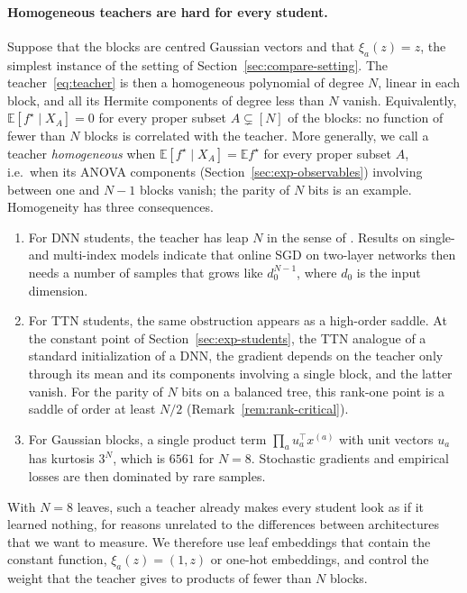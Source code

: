 \documentclass[11pt]{article}
\newcommand{\E}{\mathbb{E}}
\theoremstyle{definition}
\numberwithin{equation}{section}
\begin{document}
\paragraph{Homogeneous teachers are hard for every student.}
Suppose that the blocks are centred Gaussian vectors and that $\xi_a(z)=z$, the simplest instance of the setting of Section~\ref{sec:compare-setting}. The teacher~\eqref{eq:teacher} is then a homogeneous polynomial of degree $N$, linear in each block, and all its Hermite components of degree less than $N$ vanish. Equivalently, $\E[f^\star\mid X_A]=0$ for every proper subset $A\subsetneq[N]$ of the blocks: no function of fewer than $N$ blocks is correlated with the teacher. More generally, we call a teacher \emph{homogeneous} when $\E[f^\star\mid X_A]=\E f^\star$ for every proper subset $A$, i.e.\ when its ANOVA components (Section~\ref{sec:exp-observables}) involving between one and $N-1$ blocks vanish; the parity of $N$ bits is an example. Homogeneity has three consequences.
\begin{enumerate}[label=(\roman*),nosep]
\item For DNN students, the teacher has leap $N$ in the sense of \citet{abbe2023sgd}. Results on single- and multi-index models \citep{benarous2021online,abbe2023sgd} indicate that online SGD on two-layer networks then needs a number of samples that grows like $d_0^{N-1}$, where $d_0$ is the input dimension.
\item For TTN students, the same obstruction appears as a high-order saddle. At the constant point of Section~\ref{sec:exp-students}, the TTN analogue of a standard initialization of a DNN, the gradient depends on the teacher only through its mean and its components involving a single block, and the latter vanish. For the parity of $N$ bits on a balanced tree, this rank-one point is a saddle of order at least $N/2$ \citep[Proposition~5.3]{furman2026benign} (Remark~\ref{rem:rank-critical}).
\item For Gaussian blocks, a single product term $\prod_au_a^\top x^{(a)}$ with unit vectors $u_a$ has kurtosis $3^N$, which is $6561$ for $N=8$. Stochastic gradients and empirical losses are then dominated by rare samples.
\end{enumerate}
With $N=8$ leaves, such a teacher already makes every student look as if it learned nothing, for reasons unrelated to the differences between architectures that we want to measure. We therefore use leaf embeddings that contain the constant function, $\xi_a(z)=(1,z)$ or one-hot embeddings, and control the weight that the teacher gives to products of fewer than $N$ blocks.
\end{document}
